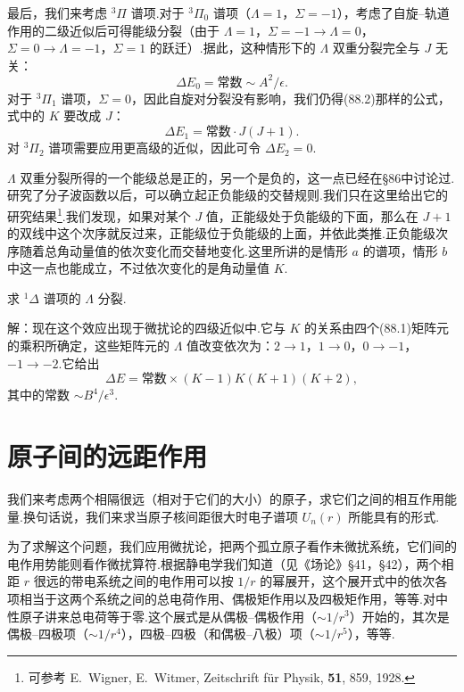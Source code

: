 最后，我们来考虑 $^3\Pi$ 谱项.对于 $^3\Pi_0$ 谱项（$\Lambda=1$，$\Sigma=-1$），考虑了自旋–轨道作用的二级近似后可得能级分裂（由于 $\Lambda=1$，$\Sigma=-1\to\Lambda=0$，$\Sigma=0\to\Lambda=-1$，$\Sigma=1$ 的跃迁）.据此，这种情形下的 $\Lambda$ 双重分裂完全与 $J$ 无关：
\begin{equation}
  \Delta E_0=\text{常数}\sim A^2/\epsilon.
\end{equation}
对于 $^3\Pi_1$ 谱项，$\Sigma=0$，因此自旋对分裂没有影响，我们仍得(88.2)那样的公式，式中的 $K$ 要改成 $J$：
\begin{equation}
  \Delta E_1=\text{常数}\cdot J(J+1).
\end{equation}
对 $^3\Pi_2$ 谱项需要应用更高级的近似，因此可令 $\Delta E_2=0$.

$\Lambda$ 双重分裂所得的一个能级总是正的，另一个是负的，这一点已经在§86中讨论过.研究了分子波函数以后，可以确立起正负能级的交替规则.我们只在这里给出它的研究结果\footnote{可参考 E.~Wigner, E.~Witmer, Zeitschrift für Physik, \textbf{51}, 859, 1928.}.我们发现，如果对某个 $J$ 值，正能级处于负能级的下面，那么在 $J+1$ 的双线中这个次序就反过来，正能级位于负能级的上面，并依此类推.正负能级次序随着总角动量值的依次变化而交替地变化.这里所讲的是情形 $a$ 的谱项，情形 $b$ 中这一点也能成立，不过依次变化的是角动量值 $K$.

\begin{xiti}

求 $^1\Delta$ 谱项的 $\Lambda$ 分裂.

解：现在这个效应出现于微扰论的四级近似中.它与 $K$ 的关系由四个(88.1)矩阵元的乘积所确定，这些矩阵元的 $\Lambda$ 值改变依次为：$2\to1$，$1\to0$，$0\to-1$，$-1\to-2$.它给出
\begin{equation*}
  \Delta E=\text{常数}\times(K-1)K(K+1)(K+2),
\end{equation*}
其中的常数 $\sim B^4/\epsilon^3$.

\end{xiti}

\section{原子间的远距作用}

我们来考虑两个相隔很远（相对于它们的大小）的原子，求它们之间的相互作用能量.换句话说，我们来求当原子核间距很大时电子谱项 $U_n(r)$ 所能具有的形式.

为了求解这个问题，我们应用微扰论，把两个孤立原子看作未微扰系统，它们间的电作用势能则看作微扰算符.根据静电学我们知道（见《场论》§41，§42），两个相距 $r$ 很远的带电系统之间的电作用可以按 $1/r$ 的幂展开，这个展开式中的依次各项相当于这两个系统之间的总电荷作用、偶极矩作用以及四极矩作用，等等.对中性原子讲来总电荷等于零.这个展式是从偶极–偶极作用（$\sim1/r^3$）开始的，其次是偶极–四极项（$\sim1/r^4$），四极–四极（和偶极–八极）项（$\sim1/r^5$），等等.

